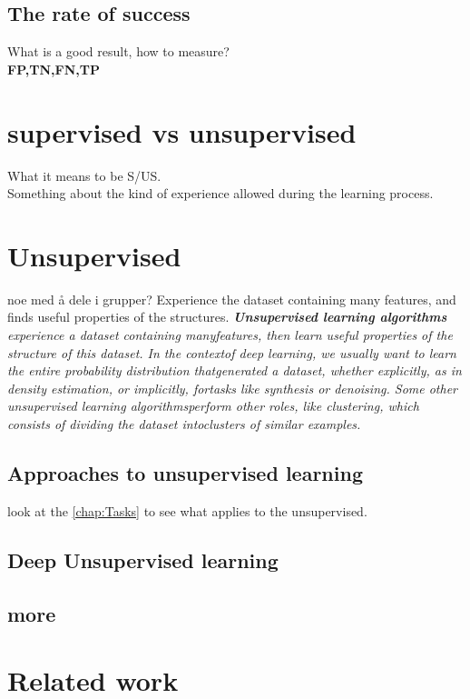 \documentclass[a4paper,english]{ifimaster}
\begin{document}
\subsection{The rate of success}
What is a good result, how to measure?\\
\textbf{FP,TN,FN,TP}\\


\section{supervised vs unsupervised}
What it means to be S/US.\\
Something about the kind of experience allowed during the learning process.


\section{Unsupervised}
noe med å dele i grupper?
Experience the dataset containing many features, and finds useful properties of the structures. 
\textit{\textbf{Unsupervised learning algorithms} experience a dataset containing manyfeatures, then learn useful properties of the structure of this dataset. In the contextof deep learning, we usually want to learn the entire probability distribution thatgenerated a dataset, whether explicitly, as in density estimation, or implicitly, fortasks like synthesis or denoising. Some other unsupervised learning algorithmsperform other roles, like clustering, which consists of dividing the dataset intoclusters of similar examples.}
\cite{Goodfellow-et-al-2016}


\subsection{Approaches to unsupervised learning}
look at the \autoref{chap:Tasks} to see what applies to the unsupervised.

\subsection{Deep Unsupervised learning}
\subsection{more}
\section{Related work}
\end{document}
